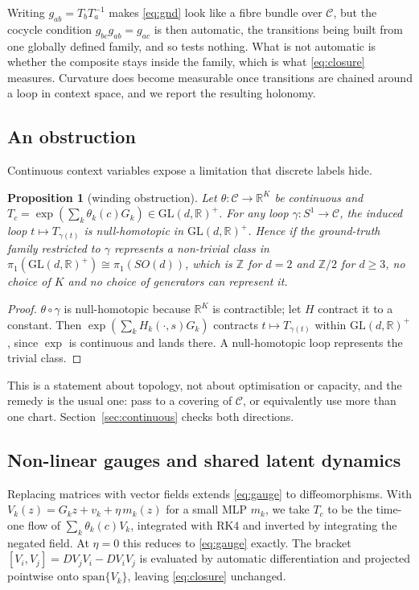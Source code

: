 \documentclass{article}
\theoremstyle{plain}
\newtheorem{proposition}{Proposition}
\newcommand{\GL}{\mathrm{GL}}
\newcommand{\R}{\mathbb{R}}
\newcommand{\Ctx}{\mathcal{C}}
\begin{document}
Writing $g_{ab} = T_b T_a^{-1}$ makes \eqref{eq:gnd} look like a fibre bundle
over $\Ctx$, but the cocycle condition $g_{bc}g_{ab} = g_{ac}$ is then automatic,
the transitions being built from one globally defined family, and so tests
nothing. What is not automatic is whether the composite stays inside the family,
which is what \eqref{eq:closure} measures. Curvature does become measurable once
transitions are chained around a loop in context space, and we report the
resulting holonomy.

\subsection{An obstruction}

Continuous context variables expose a limitation that discrete labels hide.

\begin{proposition}[winding obstruction]
\label{prop:winding}
Let $\theta : \Ctx \to \R^{K}$ be continuous and $T_c = \exp(\sum_k \theta_k(c)
G_k) \in \GL(d,\R)^{+}$. For any loop $\gamma : S^1 \to \Ctx$, the induced loop
$t \mapsto T_{\gamma(t)}$ is null-homotopic in $\GL(d,\R)^{+}$. Hence if the
ground-truth family restricted to $\gamma$ represents a non-trivial class in
$\pi_1(\GL(d,\R)^{+}) \cong \pi_1(SO(d))$, which is $\mathbb{Z}$ for $d=2$ and
$\mathbb{Z}/2$ for $d \ge 3$, no choice of $K$ and no choice of generators can
represent it.
\end{proposition}

\begin{proof}
$\theta\circ\gamma$ is null-homotopic because $\R^K$ is contractible; let $H$
contract it to a constant. Then $\exp(\sum_k H_k(\cdot,s) G_k)$ contracts
$t \mapsto T_{\gamma(t)}$ within $\GL(d,\R)^{+}$, since $\exp$ is continuous and
lands there. A null-homotopic loop represents the trivial class.
\end{proof}

This is a statement about topology, not about optimisation or capacity, and the
remedy is the usual one: pass to a covering of $\Ctx$, or equivalently use more
than one chart. Section~\ref{sec:continuous} checks both directions.

\subsection{Non-linear gauges and shared latent dynamics}

Replacing matrices with vector fields extends \eqref{eq:gauge} to
diffeomorphisms. With $V_k(z) = G_k z + v_k + \eta\, m_k(z)$ for a small MLP
$m_k$, we take $T_c$ to be the time-one flow of $\sum_k \theta_k(c) V_k$,
integrated with RK4 and inverted by integrating the negated field. At $\eta=0$
this reduces to \eqref{eq:gauge} exactly. The bracket $[V_i,V_j] = DV_j V_i -
DV_i V_j$ is evaluated by automatic differentiation and projected pointwise onto
$\mathrm{span}\{V_k\}$, leaving \eqref{eq:closure} unchanged.
\end{document}

